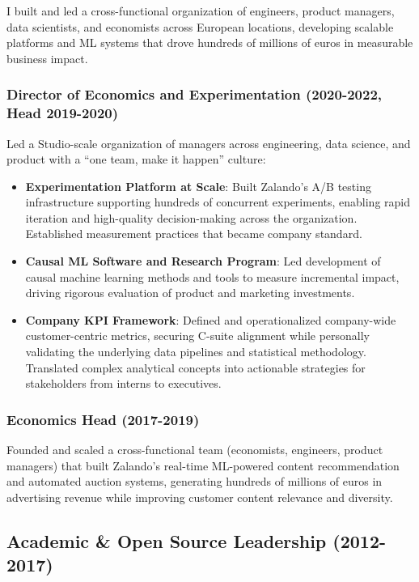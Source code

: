 \documentclass[a4paper]{article}
\begin{document}
I built and led a cross-functional organization of engineers, product managers, data scientists, and economists across European locations, developing scalable platforms and ML systems that drove hundreds of millions of euros in measurable business impact.

\subsubsection*{Director of Economics and Experimentation (2020-2022, Head 2019-2020)}

Led a Studio-scale organization of managers across engineering, data science, and product with a ``one team, make it happen'' culture:

\begin{itemize}
    \item \textbf{Experimentation Platform at Scale}: Built Zalando's A/B testing infrastructure supporting hundreds of concurrent experiments, enabling rapid iteration and high-quality decision-making across the organization. Established measurement practices that became company standard.
    \item \textbf{Causal ML Software and Research Program}: Led development of causal machine learning methods and tools to measure incremental impact, driving rigorous evaluation of product and marketing investments.
    \item \textbf{Company KPI Framework}: Defined and operationalized company-wide customer-centric metrics, securing C-suite alignment while personally validating the underlying data pipelines and statistical methodology. Translated complex analytical concepts into actionable strategies for stakeholders from interns to executives.
\end{itemize}

\subsubsection*{Economics Head (2017-2019)}

Founded and scaled a cross-functional team (economists, engineers, product managers) that built Zalando's real-time ML-powered content recommendation and automated auction systems, generating hundreds of millions of euros in advertising revenue while improving customer content relevance and diversity.

\subsection*{Academic \& Open Source Leadership (2012-2017)}
\end{document}

